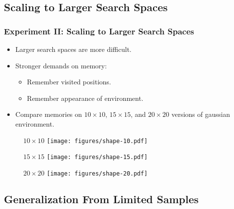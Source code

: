 \subsection{Scaling to Larger Search Spaces}

\begin{frame}
    \frametitle{Experiment II: Scaling to Larger Search Spaces}

    \begin{itemize}
        \item Larger search spaces are more difficult.
        \item Stronger demands on memory:
        \begin{itemize}
            \item Remember visited positions.
            \item Remember appearance of environment.
        \end{itemize}
        \item Compare memories on \(10 \times 10\), \(15 \times 15\), and \(20 \times 20\) versions of gaussian environment.
    \end{itemize}
\end{frame}

\begin{frame}
    \begin{figure}
        \centering
        \(10 \times 10\)
        \texttt{[image: figures/shape-10.pdf]}
    \end{figure}
\end{frame}

\begin{frame}
    \begin{figure}
        \centering
        \(15 \times 15\)
        \texttt{[image: figures/shape-15.pdf]}
    \end{figure}
\end{frame}

\begin{frame}
    \begin{figure}
        \centering
        \(20 \times 20\)
        \texttt{[image: figures/shape-20.pdf]}
    \end{figure}
\end{frame}

\subsection{Generalization From Limited Samples}

